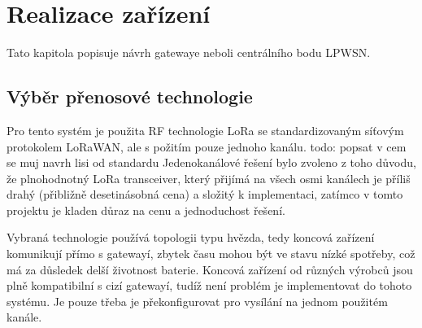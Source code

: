 \chapter{Realizace zařízení}
Tato kapitola popisuje návrh gatewaye neboli centrálního bodu LPWSN.

\section{Výběr přenosové technologie}
Pro tento systém je použita RF technologie LoRa se standardizovaným síťovým protokolem LoRaWAN, ale s požitím pouze jednoho kanálu.
todo: popsat v cem se muj navrh lisi od standardu
Jedenokanálové řešení bylo zvoleno z toho důvodu, že plnohodnotný LoRa transceiver, který přijímá na všech osmi kanálech je příliš drahý (přibližně desetinásobná cena) a složitý k implementaci, zatímco v tomto projektu je kladen důraz na cenu a jednoduchost řešení.

Vybraná technologie používá topologii typu hvězda, tedy koncová zařízení komunikují přímo s gatewayí, zbytek času mohou být ve stavu nízké spotřeby, což má za důsledek delší životnost baterie.
Koncová zařízení od různých výrobců jsou plně kompatibilní s cizí gatewayí, tudíž není problém je implementovat do tohoto systému. Je pouze třeba je překonfigurovat pro vysílání na jednom použitém kanále.




